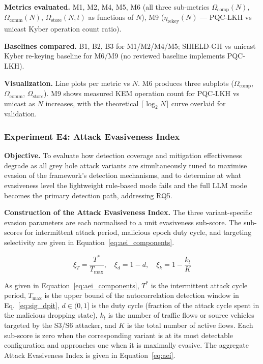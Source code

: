 \documentclass[12pt, a4paper]{report}
\newcommand{\mypar}{\vspace{0.8em}\noindent}
\begin{document}
\mypar
\textbf{Metrics evaluated.}
M1, M2, M4, M5, M6 (all three sub-metrics $\Omega_{\text{comp}}(N)$,
$\Omega_{\text{comm}}(N)$, $\Omega_{\text{store}}(N,t)$ as functions
of $N$), M9 ($\eta_{\text{rekey}}(N)$ — PQC-LKH vs unicast Kyber
operation count ratio).

\mypar
\textbf{Baselines compared.}
B1, B2, B3 for M1/M2/M4/M5; SHIELD-GH vs unicast Kyber re-keying
baseline for M6/M9 (no reviewed baseline implements PQC-LKH).

\mypar
\textbf{Visualization.}
Line plots per metric vs $N$. M6 produces three subplots
($\Omega_{\text{comp}}$, $\Omega_{\text{comm}}$,
$\Omega_{\text{store}}$). M9 shows measured KEM operation count for
PQC-LKH vs unicast as $N$ increases, with the theoretical
$\lceil\log_2 N\rceil$ curve overlaid for validation.

\mypar
\subsubsection{Experiment E4: Attack Evasiveness Index}
\label{sec:exp4}

\mypar
\textbf{Objective.}
To evaluate how detection coverage and mitigation effectiveness degrade
as all grey hole attack variants are simultaneously tuned to maximise
evasion of the framework's detection mechanisms, and to determine at
what evasiveness level the lightweight rule-based mode fails and the
full LLM mode becomes the primary detection path, addressing RQ5.

\mypar
\textbf{Construction of the Attack Evasiveness Index.}
The three variant-specific evasion parameters are each normalised to
a unit evasiveness sub-score. The sub-scores for intermittent attack
period, malicious epoch duty cycle, and targeting selectivity are
given in Equation~\eqref{eq:aei_components}.

\begin{equation}
\label{eq:aei_components}
\xi_T = \frac{T^*}{T_{\max}},
\quad
\xi_d = 1 - d,
\quad
\xi_k = 1 - \frac{k_t}{K}
\end{equation}

As given in Equation~\eqref{eq:aei_components}, $T^*$ is the
intermittent attack cycle period, $T_{\max}$ is the upper bound of
the autocorrelation detection window in Eq.~\eqref{eq:sig_dpit},
$d \in (0,1]$ is the duty cycle (fraction of the attack cycle spent
in the malicious dropping state), $k_t$ is the number of traffic
flows or source vehicles targeted by the S3/S6 attacker, and $K$ is
the total number of active flows. Each sub-score is zero when the
corresponding variant is at its most detectable configuration and
approaches one when it is maximally evasive. The aggregate Attack
Evasiveness Index is given in Equation~\eqref{eq:aei}.
\end{document}
